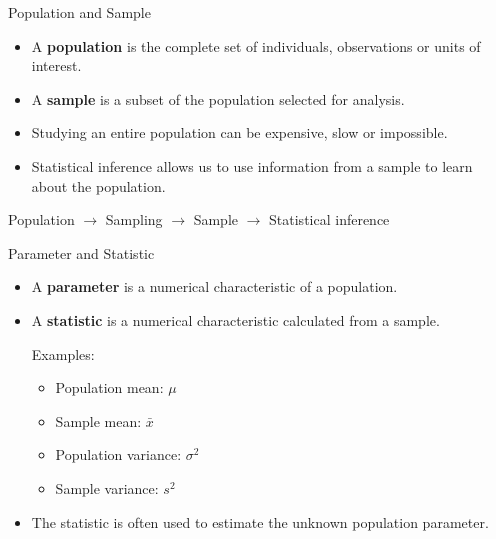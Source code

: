 \documentclass{beamer}
\begin{document}
\begin{frame}{Population and Sample}

\begin{itemize}

  \item A \textbf{population} is the complete set of individuals, observations or units of interest.

  \vskip 0.4cm

  \item A \textbf{sample} is a subset of the population selected for analysis.

  \vskip 0.4cm

  \item Studying an entire population can be expensive, slow or impossible.

  \vskip 0.4cm

  \item Statistical inference allows us to use information from a sample to learn about the population.

\end{itemize}

\vskip 0.6cm

\begin{center}

Population $\rightarrow$ Sampling $\rightarrow$ Sample $\rightarrow$ Statistical inference

\end{center}

\end{frame}


\begin{frame}{Parameter and Statistic}

\begin{itemize}

  \item A \textbf{parameter} is a numerical characteristic of a population.

  \vskip 0.3cm

  \item A \textbf{statistic} is a numerical characteristic calculated from a sample.

  \vskip 0.4cm

  Examples:

  \begin{itemize}
    \item Population mean: $\mu$
    \item Sample mean: $\bar{x}$
    \item Population variance: $\sigma^2$
    \item Sample variance: $s^2$
  \end{itemize}

  \vskip 0.4cm

  \item The statistic is often used to estimate the unknown population parameter.

\end{itemize}

\end{frame}
\end{document}
